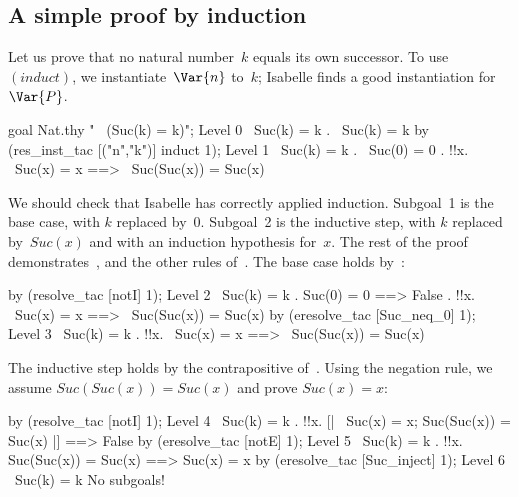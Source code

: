 \subsection{A simple proof by induction}
Let us prove that no natural number~$k$ equals its own successor.  To
use~$(induct)$, we instantiate~$\Var{n}$ to~$k$; Isabelle finds a good
instantiation for~$\Var{P}$.
\begin{ttbox} 
goal Nat.thy "~ (Suc(k) = k)";
{\out Level 0}
{\out ~Suc(k) = k}
{. ~Suc(k) = k}
\ttbreak
by (res_inst_tac [("n","k")] induct 1);
{\out Level 1}
{\out ~Suc(k) = k}
{. ~Suc(0) = 0}
{. !!x. ~Suc(x) = x ==> ~Suc(Suc(x)) = Suc(x)}
\end{ttbox} 
We should check that Isabelle has correctly applied induction.  Subgoal~1
is the base case, with $k$ replaced by~0.  Subgoal~2 is the inductive step,
with $k$ replaced by~$Suc(x)$ and with an induction hypothesis for~$x$.
The rest of the proof demonstrates~,  and the
other rules of~.  The base case holds by~:
\begin{ttbox} 
by (resolve_tac [notI] 1);
{\out Level 2}
{\out ~Suc(k) = k}
{. Suc(0) = 0 ==> False}
{. !!x. ~Suc(x) = x ==> ~Suc(Suc(x)) = Suc(x)}
\ttbreak
by (eresolve_tac [Suc_neq_0] 1);
{\out Level 3}
{\out ~Suc(k) = k}
{. !!x. ~Suc(x) = x ==> ~Suc(Suc(x)) = Suc(x)}
\end{ttbox} 
The inductive step holds by the contrapositive of~.
Using the negation rule, we assume $Suc(Suc(x)) = Suc(x)$ and prove $Suc(x)=x$:
\begin{ttbox} 
by (resolve_tac [notI] 1);
{\out Level 4}
{\out ~Suc(k) = k}
{. !!x. [| ~Suc(x) = x; Suc(Suc(x)) = Suc(x) |] ==> False}
\ttbreak
by (eresolve_tac [notE] 1);
{\out Level 5}
{\out ~Suc(k) = k}
{. !!x. Suc(Suc(x)) = Suc(x) ==> Suc(x) = x}
\ttbreak
by (eresolve_tac [Suc_inject] 1);
{\out Level 6}
{\out ~Suc(k) = k}
{\out No subgoals!}
\end{ttbox} 


